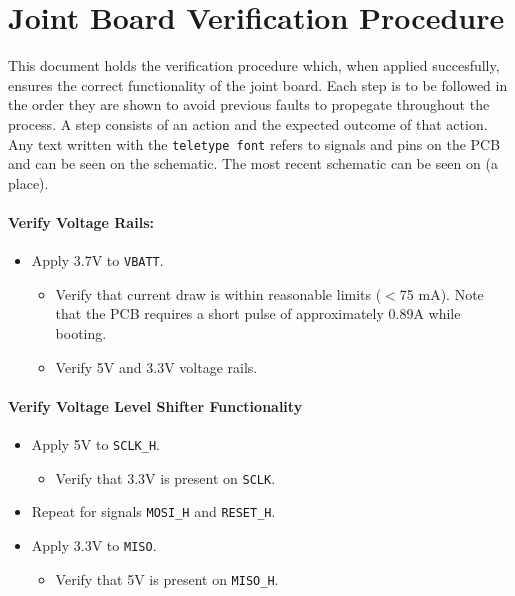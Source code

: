 \section{Joint Board Verification Procedure} %
\label{sec:joint_board_verification_procedure}
This document holds the verification procedure which, when applied succesfully, ensures the correct functionality of the joint board.
Each step is to be followed in the order they are shown to avoid previous faults to propegate throughout the process.
A step consists of an action and the expected outcome of that action.
Any text written with the \texttt{teletype font} refers to signals and pins on the PCB and can be seen on the schematic.
The most recent schematic can be seen on (a place).
\paragraph{Verify Voltage Rails:} %
 \label{par:verify_voltage_rails}
 \begin{itemize}
 	\item Apply 3.7V to \texttt{VBATT}.
 	\begin{itemize}
 		\item Verify that current draw is within reasonable limits ($<$75 mA). Note that the PCB requires a short pulse of approximately 0.89A while booting.
 		\item Verify 5V and 3.3V voltage rails.
 	\end{itemize}
 \end{itemize}

\paragraph{Verify Voltage Level Shifter Functionality} %
\label{par:verify_voltage_level_shifter_functionality}
\begin{itemize}
	\item Apply 5V to \texttt{SCLK\_H}.
	\begin{itemize}
		\item  Verify that 3.3V is present on \texttt{SCLK}.
	\end{itemize}
	\item Repeat for signals \texttt{MOSI\_H} and \texttt{RESET\_H}.
	\item Apply 3.3V to \texttt{MISO}.
	\begin{itemize}
		\item  Verify that 5V is present on \texttt{MISO\_H}.
	\end{itemize}
\end{itemize}


